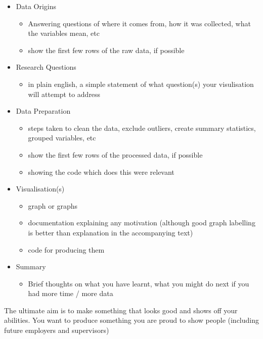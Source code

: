\documentclass[
  12pt,
  a5paper,
]{book}
\providecommand{\tightlist}{%
  \setlength{\itemsep}{0pt}\setlength{\parskip}{0pt}}
\begin{document}
\begin{itemize}
\tightlist
\item
  Data Origins

  \begin{itemize}
  \tightlist
  \item
    Answering questions of where it comes from, how it was collected, what the variables mean, etc
  \item
    show the first few rows of the raw data, if possible
  \end{itemize}
\item
  Research Questions

  \begin{itemize}
  \tightlist
  \item
    in plain english, a simple statement of what question(s) your visulisation will attempt to address
  \end{itemize}
\item
  Data Preparation

  \begin{itemize}
  \tightlist
  \item
    steps taken to clean the data, exclude outliers, create summary statistics, grouped variables, etc
  \item
    show the first few rows of the processed data, if possible
  \item
    showing the code which does this were relevant
  \end{itemize}
\item
  Visualisation(s)

  \begin{itemize}
  \tightlist
  \item
    graph or graphs
  \item
    documentation explaining any motivation (although good graph labelling is better than explanation in the accompanying text)
  \item
    code for producing them
  \end{itemize}
\item
  Summary

  \begin{itemize}
  \tightlist
  \item
    Brief thoughts on what you have learnt, what you might do next if you had more time / more data
  \end{itemize}
\end{itemize}

The ultimate aim is to make something that looks good and shows off your abilities. You want to produce something you are proud to show people (including future employers and supervisors)
\end{document}
